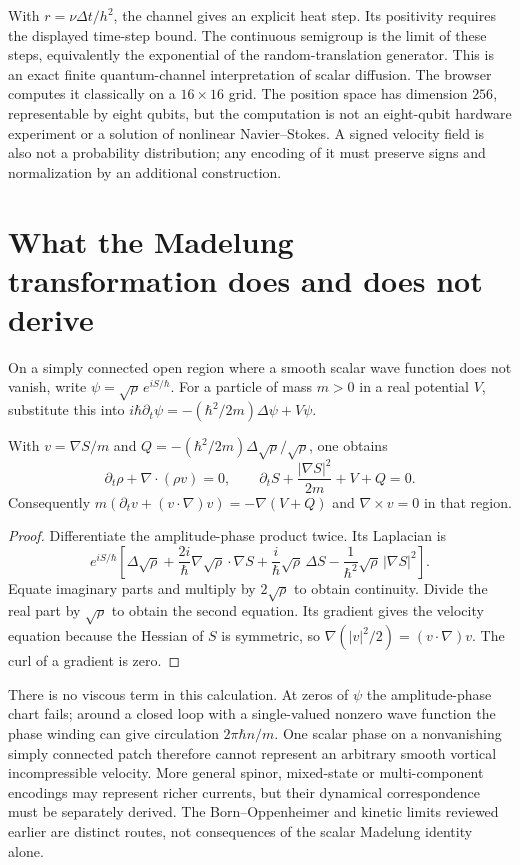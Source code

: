 With $r=\nu\Delta t/h^2$, the channel gives an explicit heat step. Its positivity requires the displayed time-step bound. The continuous semigroup is the limit of these steps, equivalently the exponential of the random-translation generator. This is an exact finite quantum-channel interpretation of scalar diffusion. The browser computes it classically on a $16\times16$ grid. The position space has dimension $256$, representable by eight qubits, but the computation is not an eight-qubit hardware experiment or a solution of nonlinear Navier--Stokes. A signed velocity field is also not a probability distribution; any encoding of it must preserve signs and normalization by an additional construction.

\section{What the Madelung transformation does and does not derive}

On a simply connected open region where a smooth scalar wave function does not vanish, write $\psi=\sqrt\rho\,e^{iS/\hbar}$. For a particle of mass $m>0$ in a real potential $V$, substitute this into
$i\hbar\partial_t\psi=-(\hbar^2/2m)\Delta\psi+V\psi$.

\begin{proposition}
\label{prop:fluid-madelung}
With $v=\nabla S/m$ and $Q=-(\hbar^2/2m)\Delta\sqrt\rho/\sqrt\rho$, one obtains
\[
 \partial_t\rho+\nabla\cdot(\rho v)=0,
 \qquad
 \partial_tS+\frac{|\nabla S|^2}{2m}+V+Q=0.
\]
Consequently $m(\partial_tv+(v\cdot\nabla)v)=-\nabla(V+Q)$ and $\nabla\times v=0$ in that region.
\end{proposition}
\begin{proof}
Differentiate the amplitude-phase product twice. Its Laplacian is
\[
 e^{iS/\hbar}\left[\Delta\sqrt\rho+
 \frac{2i}{\hbar}\nabla\sqrt\rho\cdot\nabla S+
 \frac{i}{\hbar}\sqrt\rho\,\Delta S-
 \frac1{\hbar^2}\sqrt\rho\,|\nabla S|^2\right].
\]
Equate imaginary parts and multiply by $2\sqrt\rho$ to obtain continuity. Divide the real part by $\sqrt\rho$ to obtain the second equation. Its gradient gives the velocity equation because the Hessian of $S$ is symmetric, so $\nabla(|v|^2/2)=(v\cdot\nabla)v$. The curl of a gradient is zero.
\end{proof}

There is no viscous term in this calculation. At zeros of $\psi$ the amplitude-phase chart fails; around a closed loop with a single-valued nonzero wave function the phase winding can give circulation $2\pi\hbar n/m$. One scalar phase on a nonvanishing simply connected patch therefore cannot represent an arbitrary smooth vortical incompressible velocity. More general spinor, mixed-state or multi-component encodings may represent richer currents, but their dynamical correspondence must be separately derived. The Born--Oppenheimer and kinetic limits reviewed earlier are distinct routes, not consequences of the scalar Madelung identity alone.

